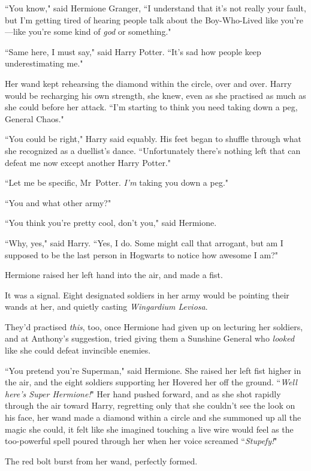 ``You know," said Hermione Granger, ``I understand that it's not really your fault, but I'm getting tired of hearing people talk about the Boy-Who-Lived like you're—like you're some kind of \emph{god} or something."

``Same here, I must say," said Harry Potter. ``It's sad how people keep underestimating me."

Her wand kept rehearsing the diamond within the circle, over and over. Harry would be recharging his own strength, she knew, even as she practised as much as she could before her attack. ``I'm starting to think you need taking down a peg, General Chaos."

``You could be right," Harry said equably. His feet began to shuffle through what she recognized as a duellist's dance. ``Unfortunately there's nothing left that can defeat me now except another Harry Potter."

``Let me be specific, Mr~Potter. \emph{I'm} taking you down a peg."

``You and what other army?"

``You think you're pretty cool, don't you," said Hermione.

``Why, yes," said Harry. ``Yes, I do. Some might call that arrogant, but am I supposed to be the last person in Hogwarts to notice how awesome I am?"

Hermione raised her left hand into the air, and made a fist.

It was a signal. Eight designated soldiers in her army would be pointing their wands at her, and quietly casting \emph{Wingardium Leviosa}.

They'd practised \emph{this}, too, once Hermione had given up on lecturing her soldiers, and at Anthony's suggestion, tried giving them a Sunshine General who \emph{looked} like she could defeat invincible enemies.

``You pretend you're Superman," said Hermione. She raised her left fist higher in the air, and the eight soldiers supporting her Hovered her off the ground. ``\emph{Well here's Super Hermione!}" Her hand pushed forward, and as she shot rapidly through the air toward Harry, regretting only that she couldn't see the look on his face, her wand made a diamond within a circle and she summoned up all the magic she could, it felt like she imagined touching a live wire would feel as the too-powerful spell poured through her when her voice screamed ``\emph{Stupefy!}"

The red bolt burst from her wand, perfectly formed.

